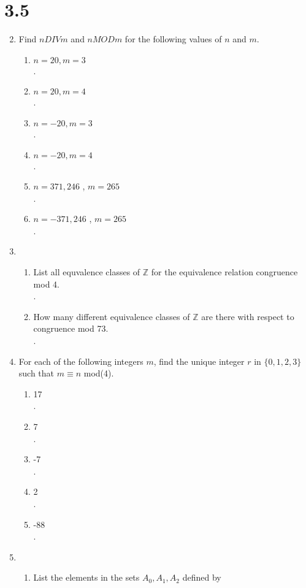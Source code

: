 \documentclass[11pt]{article}
\newcommand{\Z}{\mathbb{Z}}
\begin{document}
\section*{3.5}
\begin{enumerate}
\setcounter{enumi}{1}
\item Find $n DIV m$ and $n MOD m$ for the following values of $n$ and $m$.
	\begin{enumerate}
	\item $n=20,m=3$\\
	.
	\item $n=20,m=4$\\
	.
	\item $n=-20,m=3$\\
	.
	\item $n=-20,m=4$\\
	.
	\item $n=371,246$ , $m=265$\\	
	.
	\item $n=-371,246$ , $m=265$\\	
	.
	\end{enumerate}
\setcounter{enumi}{3}
\item 
	\begin{enumerate}
	\item List all equvalence classes of $\Z$ for the equivalence relation congruence mod 4.\\
	.
	\item How many different equivalence classes of $\Z$ are there with respect to congruence mod 73.\\
	.
	\end{enumerate}
\item For each of the following integers $m$, find the unique integer $r$ in $\{0,1,2,3\}$ such that $m\equiv n$ mod(4).\\
	\begin{enumerate}
	\item 17\\
	.
	\item 7\\
	.
	\item -7\\
	.
	\item 2\\
	.
	\item -88\\
	.
	\end{enumerate}
\setcounter{enumi}{7}
\item
	\begin{enumerate}
	\item List the elements in the sets $A_0,A_1,A_2$ defined by\\

\end{enumerate}
\end{enumerate}
\end{document}

